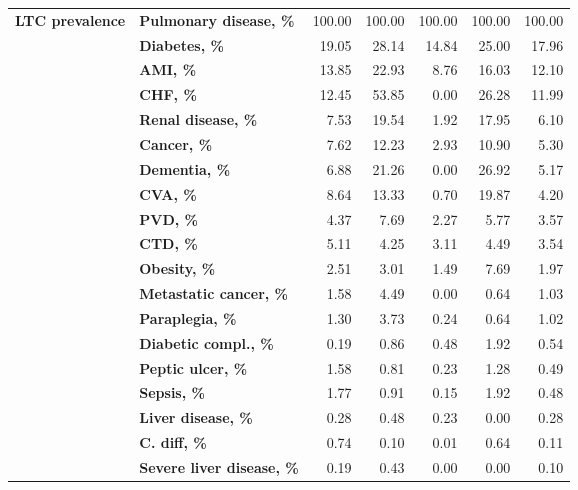 \begin{table}
{\begin{tabular}{llrrrrr}
        \textbf{LTC prevalence} & \textbf{Pulmonary disease, \%} &   100.00 &   100.00 &   100.00 &    100.00 &     100.00 \\
               & \textbf{Diabetes, \%} &    19.05 &    28.14 &    14.84 &     25.00 &      17.96 \\
               & \textbf{AMI, \%} &    13.85 &    22.93 &     8.76 &     16.03 &      12.10 \\
               & \textbf{CHF, \%} &    12.45 &    53.85 &     0.00 &     26.28 &      11.99 \\
               & \textbf{Renal disease, \%} &     7.53 &    19.54 &     1.92 &     17.95 &       6.10 \\
               & \textbf{Cancer, \%} &     7.62 &    12.23 &     2.93 &     10.90 &       5.30 \\
               & \textbf{Dementia, \%} &     6.88 &    21.26 &     0.00 &     26.92 &       5.17 \\
               & \textbf{CVA, \%} &     8.64 &    13.33 &     0.70 &     19.87 &       4.20 \\
               & \textbf{PVD, \%} &     4.37 &     7.69 &     2.27 &      5.77 &       3.57 \\
               & \textbf{CTD, \%} &     5.11 &     4.25 &     3.11 &      4.49 &       3.54 \\
               & \textbf{Obesity, \%} &     2.51 &     3.01 &     1.49 &      7.69 &       1.97 \\
               & \textbf{Metastatic cancer, \%} &     1.58 &     4.49 &     0.00 &      0.64 &       1.03 \\
               & \textbf{Paraplegia, \%} &     1.30 &     3.73 &     0.24 &      0.64 &       1.02 \\
               & \textbf{Diabetic compl., \%} &     0.19 &     0.86 &     0.48 &      1.92 &       0.54 \\
               & \textbf{Peptic ulcer, \%} &     1.58 &     0.81 &     0.23 &      1.28 &       0.49 \\
               & \textbf{Sepsis, \%} &     1.77 &     0.91 &     0.15 &      1.92 &       0.48 \\
               & \textbf{Liver disease, \%} &     0.28 &     0.48 &     0.23 &      0.00 &       0.28 \\
               & \textbf{C. diff, \%} &     0.74 &     0.10 &     0.01 &      0.64 &       0.11 \\
               & \textbf{Severe liver disease, \%} &     0.19 &     0.43 &     0.00 &      0.00 &       0.10 \\

\end{tabular}}
\end{table}

